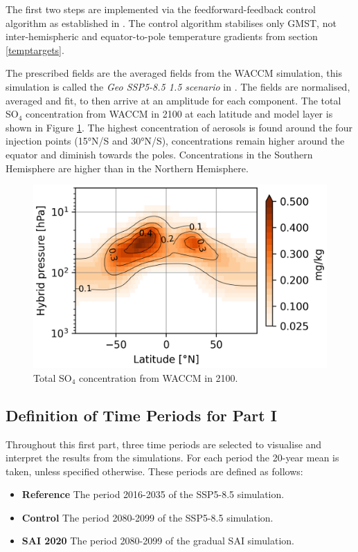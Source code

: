 The first two steps are implemented via the feedforward-feedback control algorithm as established in \textcite{kravitz2017}. The control algorithm stabilises only GMST, not inter-hemispheric and equator-to-pole temperature gradients from section \ref{temptargets}.

The prescribed fields are the averaged fields from the WACCM simulation, this simulation is called the \textit{Geo SSP5-8.5 1.5 scenario} in \textcite{tilmes2020}. The fields are normalised, averaged and fit, to then arrive at an amplitude for each component. The total SO$_4$ concentration from WACCM in 2100 at each latitude and model layer is shown in Figure \ref{fig:strataero}. The highest concentration of aerosols is found around the four injection points (15°N/S and 30°N/S), concentrations remain higher around the equator and diminish towards the poles. Concentrations in the Southern Hemisphere are higher than in the Northern Hemisphere. 

\begin{figure}[H]
	\centering
	\includegraphics[width=0.6\linewidth]{images/strataero.png}
	\caption{Total SO$_4$ concentration from WACCM in 2100.}
	\label{fig:strataero}
\end{figure}

\subsection{Definition of Time Periods for Part I}
Throughout this first part, three time periods are selected to visualise and interpret the results from the simulations. For each period the 20-year mean is taken, unless specified otherwise. These periods are defined as follows:

\begin{itemize}
    \item \textbf{Reference} The period 2016-2035 of the SSP5-8.5 simulation.
    \item \textbf{Control} The period 2080-2099 of the SSP5-8.5 simulation.
    \item \textbf{SAI 2020} The period 2080-2099 of the gradual SAI simulation.
\end{itemize} %


